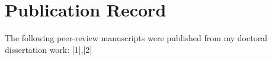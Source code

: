 \documentclass[11pt,letterpaper,sans]{moderncv}   %
\begin{document}
\maketitle


\section{Publication Record}


\vline
\setcounter{enumiv}{0}

\vspace*{+0.5cm}
The following peer-review manuscripts were published from my doctoral dissertation work: [1],[2]

\end{document}
